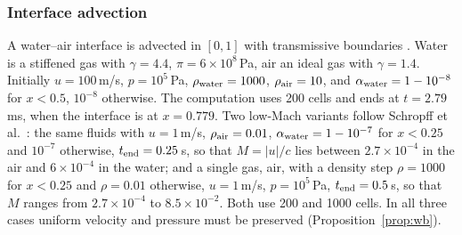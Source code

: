 \documentclass[a4paper,fleqn]{cas-sc}
\begin{document}
\subsubsection{Interface advection}
\label{sec:res_interface}
A water--air interface is advected in $[0,1]$ with transmissive boundaries \cite[Sec.~4.1]{SPB2009}. Water is a
stiffened gas with $\gamma=4.4$, $\pi=6\times10^8$\,Pa, air an ideal gas with $\gamma=1.4$. Initially $u=100$\,m/s,
$p=10^5$\,Pa, $\rho_{\rm water}=1000$, $\rho_{\rm air}=10$, and $\alpha_{\rm water}=1-10^{-8}$ for $x<0.5$, $10^{-8}$ otherwise. The
computation uses 200 cells and ends at $t=2.79$\,ms, when the interface is at $x=0.779$. Two low-Mach variants follow
Schropff et al.\ \cite{Schropff2026}: the same fluids with $u=1$\,m/s, $\rho_{\rm air}=0.01$, $\alpha_{\rm water}=1-10^{-7}$ for $x<0.25$ and $10^{-7}$
otherwise, $t_{\rm end}=0.25$\,s, so that $M=|u|/c$ lies between $2.7\times10^{-4}$ in the air and $6\times10^{-4}$ in the water; and a single gas, air, with a density step $\rho=1000$ for $x<0.25$
and $\rho=0.01$ otherwise, $u=1$\,m/s, $p=10^5$\,Pa, $t_{\rm end}=0.5$\,s, so that $M$ ranges from $2.7\times10^{-4}$ to
$8.5\times10^{-2}$. Both use 200 and 1000 cells. In all three cases uniform velocity and pressure must be preserved
(Proposition~\ref{prop:wb}).

\end{document}
